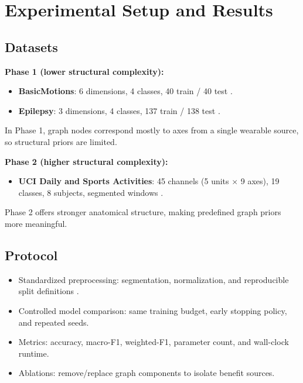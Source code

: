 \documentclass[11pt,a4paper]{article}
\begin{document}
\newpage
\section{Experimental Setup and Results}
\subsection{Datasets}
\textbf{Phase 1 (lower structural complexity):}
\begin{itemize}[leftmargin=*]
  \item \textbf{BasicMotions}: 6 dimensions, 4 classes, 40 train / 40 test \citep{uea_basicmotions}.
  \item \textbf{Epilepsy}: 3 dimensions, 4 classes, 137 train / 138 test \citep{uea_epilepsy}.
\end{itemize}
In Phase 1, graph nodes correspond mostly to axes from a single wearable source, so structural priors are limited.

\textbf{Phase 2 (higher structural complexity):}
\begin{itemize}[leftmargin=*]
  \item \textbf{UCI Daily and Sports Activities}: 45 channels (5 units $\times$ 9 axes), 19 classes, 8 subjects, segmented windows \citep{uci_dsa}.
\end{itemize}
Phase 2 offers stronger anatomical structure, making predefined graph priors more meaningful.

\subsection{Protocol}
\begin{itemize}[leftmargin=*]
  \item Standardized preprocessing: segmentation, normalization, and reproducible split definitions \citep{dau2019ucr}.
  \item Controlled model comparison: same training budget, early stopping policy, and repeated seeds.
  \item Metrics: accuracy, macro-F1, weighted-F1, parameter count, and wall-clock runtime.
  \item Ablations: remove/replace graph components to isolate benefit sources.
\end{itemize}

\end{document}
